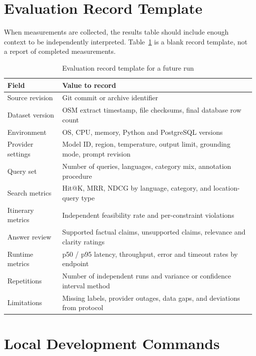 \section{Evaluation Record Template}

When measurements are collected, the results table should include enough context to be independently interpreted. Table~\ref{tab:evaluation_record} is a blank record template, not a report of completed measurements.

\begin{table}[htbp]
    \centering
    \caption{Evaluation record template for a future run}
    \label{tab:evaluation_record}
    \renewcommand{\arraystretch}{1.3}
    \begin{tabularx}{\textwidth}{>{\raggedright\arraybackslash}p{4.0cm} X}
        \toprule
        \textbf{Field} & \textbf{Value to record} \\
        \midrule
        Source revision & Git commit or archive identifier \\
        Dataset version & OSM extract timestamp, file checksums, final database row count \\
        Environment & OS, CPU, memory, Python and PostgreSQL versions \\
        Provider settings & Model ID, region, temperature, output limit, grounding mode, prompt revision \\
        Query set & Number of queries, languages, category mix, annotation procedure \\
        Search metrics & Hit@K, MRR, NDCG by language, category, and location-query type \\
        Itinerary metrics & Independent feasibility rate and per-constraint violations \\
        Answer review & Supported factual claims, unsupported claims, relevance and clarity ratings \\
        Runtime metrics & p50 / p95 latency, throughput, error and timeout rates by endpoint \\
        Repetitions & Number of independent runs and variance or confidence interval method \\
        Limitations & Missing labels, provider outages, data gaps, and deviations from protocol \\
        \bottomrule
    \end{tabularx}
\end{table}

\section{Local Development Commands}

